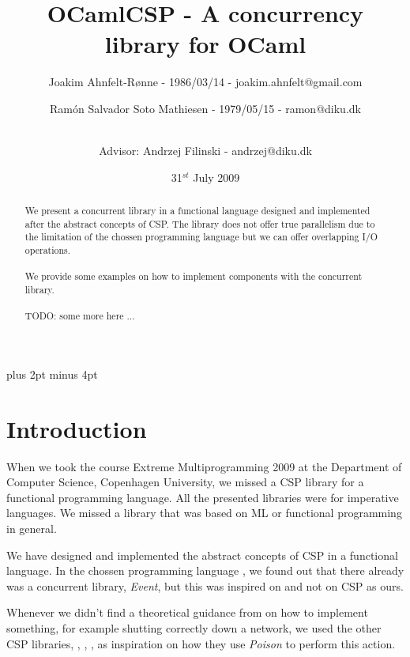 \documentclass[a4paper,12pt]{article}
\title{OCamlCSP - A concurrency library for OCaml}
\author{Joakim Ahnfelt-Rønne - 1986/03/14 - joakim.ahnfelt@gmail.com \and 
        Ramón Salvador Soto Mathiesen - 1979/05/15 - ramon@diku.dk \and
        \\ Advisor: Andrzej Filinski - andrzej@diku.dk}
\date{31$^{st}$ July 2009}
\begin{document}
\maketitle

\newpage
{}
\begin{abstract}
We present a concurrent library in a functional language designed and
implemented after the abstract concepts of CSP\cite{hoare}. The library does
not offer true parallelism due to the limitation of the chossen programming
language but we can offer overlapping I/O operations.
\\ \\
We provide some examples on how to implement components with the concurrent
library.
\\ \\
TODO: some more here ...
\end{abstract}

\newpage
\setcounter{tocdepth}{2}
\setcounter{secttocdepth}{3}
\dosecttoc \tableofcontents
\newpage

\parindent=0pt
\parskip=8pt plus 2pt minus 4pt

\section{Introduction}
When we took the course Extreme Multiprogramming 2009 at the Department of
Computer Science, Copenhagen University, we missed a CSP\cite{hoare} library for
a functional programming language. All the presented libraries were for
imperative languages. We missed a library that was based on ML or functional
programming in general.

We have designed and implemented the abstract concepts of CSP in a functional
language. In the chossen programming language \cite{ocaml}, we found out
that there already was a concurrent library, {\it Event}, but this was inspired
on \cite{concurrentml} and not on CSP as ours.

Whenever we didn't find a theoretical guidance from \cite{hoare} on how to
implement something, for example shutting correctly down a network, we used the
other CSP libraries, \cite{pycsp}, \cite{jcsp}, \cite{cppcsp2}, as inspiration
on how they use {\it Poison} to perform this action.
\end{document}
